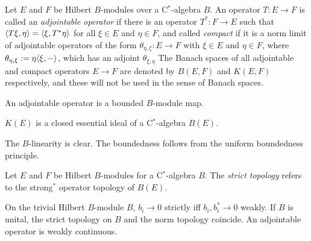 \documentclass{../../large}
\begin{document}
\begin{prb}
Let $E$ and $F$ be Hilbert $B$-modules over a C$^*$-algebra $B$.
An operator $T:E\to F$ is called an \emph{adjointable operator} if there is an operator $T^*:F\to E$ such that $\langle T\xi,\eta\rangle=\langle\xi,T^*\eta\rangle$ for all $\xi\in E$ and $\eta\in F$, and called \emph{compact} if it is a norm limit of adjointable operators of the form $\theta_{\eta,\xi}:E\to F$ with $\xi\in E$ and $\eta\in F$, where $\theta_{\eta,\xi}:=\eta\langle\xi,-\rangle$, which has an adjoint $\theta_{\xi,\eta}$
The Banach spaces of all adjointable and compact operators $E\to F$ are denoted by $B(E,F)$ and $K(E,F)$ respectively, and these will not be used in the sense of Banach spaces.
\begin{parts}
\item An adjointable operator is a bounded $B$-module map.
\item $K(E)$ is a closed essential ideal of a C$^*$-algebra $B(E)$.
\item
\end{parts}
\end{prb}
\begin{pf}
The $B$-linearity is clear.
The boundedness follows from the uniform boundedness principle.

\end{pf}


\begin{prb}
Let $E$ and $F$ be Hilbert $B$-modules for a C$^*$-algebra $B$.
The \emph{strict topology} refers to the strong$^*$ operator topology of $B(E)$.



On the trivial Hilbert $B$-module $B$, $b_i\to0$ strictly iff $b_i,b_i^*\to0$ weakly.
If $B$ is unital, the strict topology on $B$ and the norm topology coincide.
An adjointable operator is weakly continuous.
\end{prb}
\end{document}
